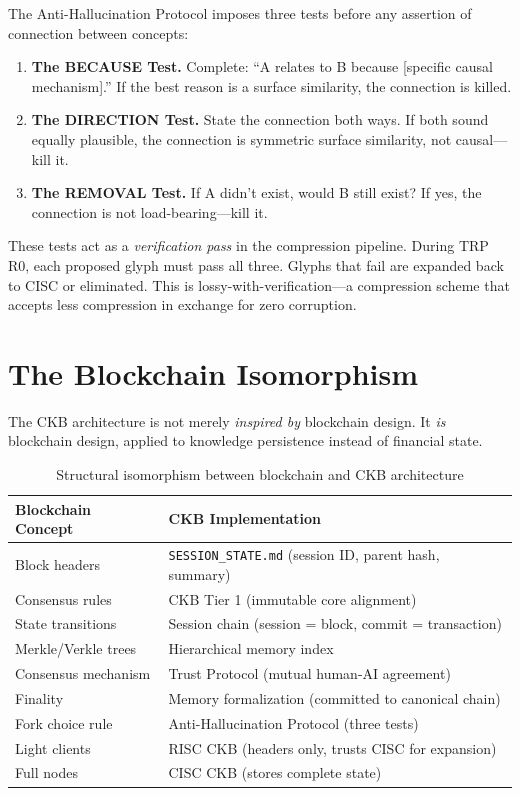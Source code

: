 \documentclass[11pt, a4paper]{article}
\begin{document}
The Anti-Hallucination Protocol imposes three tests before any assertion of connection between concepts:

\begin{enumerate}[leftmargin=*]
    \item \textbf{The BECAUSE Test.} Complete: ``A relates to B because [specific causal mechanism].'' If the best reason is a surface similarity, the connection is killed.
    \item \textbf{The DIRECTION Test.} State the connection both ways. If both sound equally plausible, the connection is symmetric surface similarity, not causal---kill it.
    \item \textbf{The REMOVAL Test.} If A didn't exist, would B still exist? If yes, the connection is not load-bearing---kill it.
\end{enumerate}

These tests act as a \emph{verification pass} in the compression pipeline. During TRP R0, each proposed glyph must pass all three. Glyphs that fail are expanded back to CISC or eliminated. This is lossy-with-verification---a compression scheme that accepts less compression in exchange for zero corruption.

\section{The Blockchain Isomorphism}
\label{sec:blockchain}

The CKB architecture is not merely \emph{inspired by} blockchain design. It \emph{is} blockchain design, applied to knowledge persistence instead of financial state.

\begin{table}[h]
\centering
\caption{Structural isomorphism between blockchain and CKB architecture}
\label{tab:blockchain}
\begin{tabular}{@{}ll@{}}
\toprule
\textbf{Blockchain Concept} & \textbf{CKB Implementation} \\
\midrule
Block headers & \texttt{SESSION\_STATE.md} (session ID, parent hash, summary) \\
Consensus rules & CKB Tier 1 (immutable core alignment) \\
State transitions & Session chain (session = block, commit = transaction) \\
Merkle/Verkle trees & Hierarchical memory index \\
Consensus mechanism & Trust Protocol (mutual human-AI agreement) \\
Finality & Memory formalization (committed to canonical chain) \\
Fork choice rule & Anti-Hallucination Protocol (three tests) \\
Light clients & RISC CKB (headers only, trusts CISC for expansion) \\
Full nodes & CISC CKB (stores complete state) \\
\bottomrule
\end{tabular}
\end{table}
\end{document}

